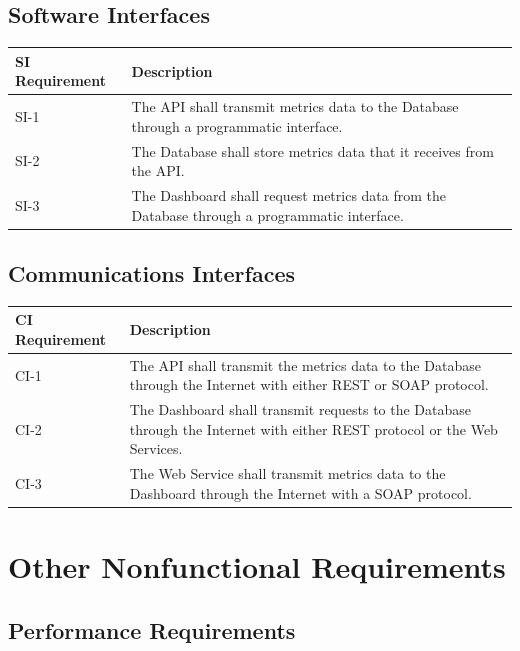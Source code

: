 \documentclass[12pt,oneside,letterpaper]{article}
\begin{document}
\subsection{Software Interfaces}

\begin{longtable}{|l|p{3.8in}|}
\hline
\textbf{SI Requirement}&\textbf{Description}\\
\hline
SI-1&The API shall transmit metrics data to the Database through a programmatic interface.\\
\hline
SI-2&The Database shall store metrics data that it receives from the API.\\
\hline
SI-3&The Dashboard shall request metrics data from the Database through a programmatic interface.\\
\hline
\end{longtable}

\subsection{Communications Interfaces}

\begin{longtable}{|l|p{3.8in}|}
\hline
\textbf{CI Requirement}&\textbf{Description}\\
\hline
CI-1&The API shall transmit the metrics data to the Database through the Internet with
either REST or SOAP protocol.\\
\hline
CI-2&The Dashboard shall transmit requests to the Database through the Internet
with either REST protocol or the Web Services.\\
\hline
CI-3&The Web Service shall transmit metrics data to the Dashboard through the Internet
with a SOAP protocol.\\
\hline
\end{longtable}


\section{Other Nonfunctional Requirements}

\subsection{Performance Requirements}
\end{document}
